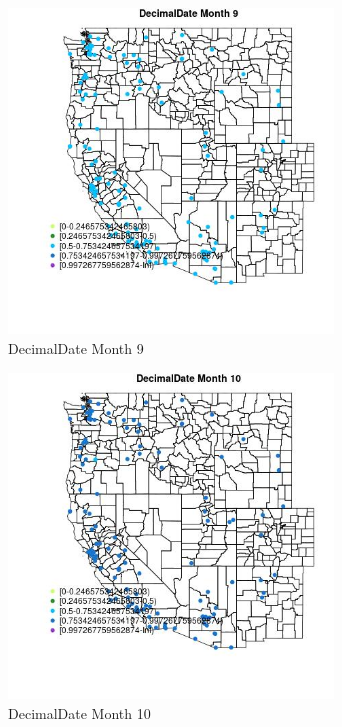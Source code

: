\begin{figure} 
\centering  
\includegraphics[width=0.77\textwidth]{Code_Outputs/Report_ML_input_PM25_Step4_part_e_de_duplicated_aves_MapObsMo9DecimalDate.jpg} 
\caption{\label{fig:Report_ML_input_PM25_Step4_part_e_de_duplicated_avesMapObsMo9DecimalDate}DecimalDate Month 9} 
\end{figure} 
 

\clearpage 

\begin{figure} 
\centering  
\includegraphics[width=0.77\textwidth]{Code_Outputs/Report_ML_input_PM25_Step4_part_e_de_duplicated_aves_MapObsMo10DecimalDate.jpg} 
\caption{\label{fig:Report_ML_input_PM25_Step4_part_e_de_duplicated_avesMapObsMo10DecimalDate}DecimalDate Month 10} 
\end{figure} 
 

